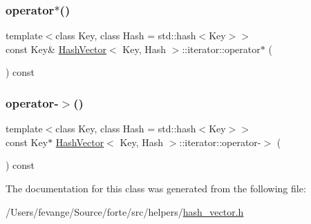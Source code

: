 \subsubsection{\texorpdfstring{operator$\ast$()}{operator*()}}
{\footnotesize\ttfamily template$<$class Key, class Hash = std\+::hash$<$\+Key$>$$>$ \\
const Key\& \mbox{\hyperlink{class_hash_vector}{Hash\+Vector}}$<$ Key, Hash $>$\+::iterator\+::operator$\ast$ (\begin{DoxyParamCaption}{ }\end{DoxyParamCaption}) const\hspace{0.3cm}{\ttfamily [inline]}}

\mbox{\label{class_hash_vector_1_1iterator_aaa5e42f71432bbdb464feca674f05690}} 
\subsubsection{\texorpdfstring{operator-\/$>$()}{operator->()}}
{\footnotesize\ttfamily template$<$class Key, class Hash = std\+::hash$<$\+Key$>$$>$ \\
const Key$\ast$ \mbox{\hyperlink{class_hash_vector}{Hash\+Vector}}$<$ Key, Hash $>$\+::iterator\+::operator-\/$>$ (\begin{DoxyParamCaption}{ }\end{DoxyParamCaption}) const\hspace{0.3cm}{\ttfamily [inline]}}



The documentation for this class was generated from the following file\+:\begin{DoxyCompactItemize}
\item 
/\+Users/fevange/\+Source/forte/src/helpers/\mbox{\hyperlink{hash__vector_8h}{hash\+\_\+vector.\+h}}\end{DoxyCompactItemize}
